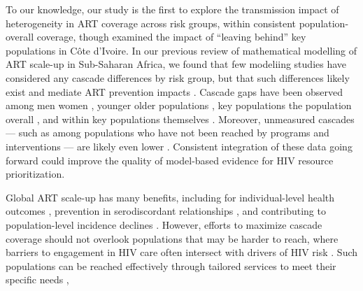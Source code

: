 To our knowledge, our study is the first to explore the transmission impact of
heterogeneity in ART coverage across risk groups,
within consistent population-overall coverage,
though \citet{Maheu-Giroux2017art} examined the impact of
``leaving behind'' key populations in C\^{o}te d'Ivoire.
In our previous review of mathematical modelling of ART scale-up in Sub-Saharan Africa,
we found that few modeliing studies have considered any cascade differences by risk group,
but that such differences likely exist and mediate ART prevention impacts \cite{Knight2022sr}.
Cascade gaps have been observed among men \vs women \cite{Quinn2019,Green2020},
younger \vs older populations \cite{Green2020,Lebelonyane2021},
key populations \vs the population overall \cite{Hakim2018},
and within key populations themselves \cite{Mayanja2018,Jaffer2022}.
Moreover, unmeasured cascades
--- such as among populations who have not been reached by programs and interventions ---
are likely even lower \cite{Hakim2018,Boothe2021}.
Consistent integration of these data going forward could
improve the quality of model-based evidence for HIV resource prioritization.
\par
Global ART scale-up has many benefits, including for
individual-level health outcomes \cite{Gabillard2013,Lundgren2015init},
prevention in serodiscordant relationships \cite{Cohen2016},
and contributing to population-level incidence declines \cite{Havlir2020}.
However, efforts to maximize cascade coverage should not overlook
populations that may be harder to reach,
where barriers to engagement in HIV care often intersect with drivers of HIV risk
\cite{Wanyenze2016,Schwartz2017,Schmidt-Sane2022,Camlin2019,Baral2019}.
Such populations can be reached effectively through
tailored services to meet their specific needs \cite{Ehrenkranz2019},
